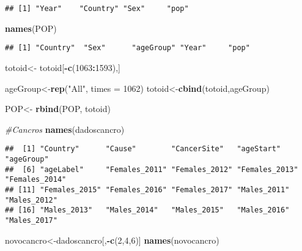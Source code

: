 \documentclass[
]{article}
\newenvironment{Shaded}{\begin{snugshade}}{\end{snugshade}}
\newcommand{\CommentTok}[1]{\textcolor[rgb]{0.56,0.35,0.01}{\textit{#1}}}
\newcommand{\DataTypeTok}[1]{\textcolor[rgb]{0.13,0.29,0.53}{#1}}
\newcommand{\DecValTok}[1]{\textcolor[rgb]{0.00,0.00,0.81}{#1}}
\newcommand{\KeywordTok}[1]{\textcolor[rgb]{0.13,0.29,0.53}{\textbf{#1}}}
\newcommand{\NormalTok}[1]{#1}
\newcommand{\OperatorTok}[1]{\textcolor[rgb]{0.81,0.36,0.00}{\textbf{#1}}}
\newcommand{\StringTok}[1]{\textcolor[rgb]{0.31,0.60,0.02}{#1}}
\begin{document}
\begin{verbatim}
## [1] "Year"    "Country" "Sex"     "pop"
\end{verbatim}

\begin{Shaded}
\begin{Highlighting}[]
\KeywordTok{names}\NormalTok{(POP)}
\end{Highlighting}
\end{Shaded}

\begin{verbatim}
## [1] "Country"  "Sex"      "ageGroup" "Year"     "pop"
\end{verbatim}

\begin{Shaded}
\begin{Highlighting}[]
\NormalTok{totoid<-}\StringTok{ }\NormalTok{totoid[}\OperatorTok{-}\KeywordTok{c}\NormalTok{(}\DecValTok{1063}\OperatorTok{:}\DecValTok{1593}\NormalTok{),]}



\NormalTok{ageGroup<-}\KeywordTok{rep}\NormalTok{(}\StringTok{"All"}\NormalTok{, }\DataTypeTok{times =} \DecValTok{1062}\NormalTok{)}
\NormalTok{totoid<-}\KeywordTok{cbind}\NormalTok{(totoid,ageGroup)}

\NormalTok{POP<-}\StringTok{ }\KeywordTok{rbind}\NormalTok{(POP, totoid)}
\end{Highlighting}
\end{Shaded}

\begin{Shaded}
\begin{Highlighting}[]
\CommentTok{#Cancros}
\KeywordTok{names}\NormalTok{(dadoscancro)}
\end{Highlighting}
\end{Shaded}

\begin{verbatim}
##  [1] "Country"      "Cause"        "CancerSite"   "ageStart"     "ageGroup"    
##  [6] "ageLabel"     "Females_2011" "Females_2012" "Females_2013" "Females_2014"
## [11] "Females_2015" "Females_2016" "Females_2017" "Males_2011"   "Males_2012"  
## [16] "Males_2013"   "Males_2014"   "Males_2015"   "Males_2016"   "Males_2017"
\end{verbatim}

\begin{Shaded}
\begin{Highlighting}[]
\NormalTok{novocancro<-dadoscancro[,}\OperatorTok{-}\KeywordTok{c}\NormalTok{(}\DecValTok{2}\NormalTok{,}\DecValTok{4}\NormalTok{,}\DecValTok{6}\NormalTok{)]}
\KeywordTok{names}\NormalTok{(novocancro)}
\end{Highlighting}
\end{Shaded}
\end{document}

